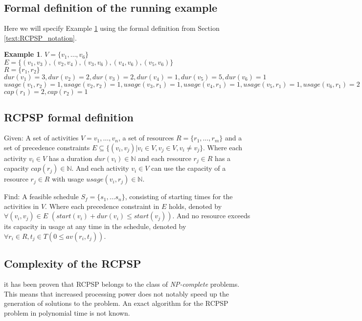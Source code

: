 \documentclass{article}
\theoremstyle{definition}
\newtheorem{example}{Example}[section]
\newcommand{\av}[2]{\ensuremath{av(r_{#1}, t_{#2})}} %
\newcommand{\capa}[1]{\ensuremath{cap(r_{#1})}} %
\newcommand{\dur}[1]{\ensuremath{dur(v_{#1})}} %
\newcommand{\usage}[2]{\ensuremath{usage(v_{#1}, r_{#2})}} %
\newcommand{\start}[1]{\ensuremath{start(v_{#1})}} %
\newenvironment{definition}[1][Definition]{\begin{trivlist}
\item[\hskip \labelsep {\bfseries #1}]}{\end{trivlist}}
\begin{document}
\subsection{Formal definition of the running example}
\label{text:running_example_definition}

Here we will specify Example \ref{exmp:running} using the formal definition from Section \ref{text:RCPSP_notation}.
\begin{example}
\label{exmp:running}
$V = \{v_1, \ldots, v_6\}$\\
$E = \{(v_1, v_3), (v_2, v_4), (v_3, v_6), (v_4, v_6), (v_5, v_6)\}$\\
$R = \{r_1, r_2\}$\\
$\dur{1} = 3, \dur{2} = 2, \dur{3} = 2, \dur{4} = 1, \dur{5} = 5, \dur{6} = 1$\\
$\usage{1}{2} = 1, \usage{2}{2} = 1, \usage{3}{1} = 1, \usage{4}{1} = 1, \usage{5}{1} = 1, \usage{6}{1} = 2$\\
$\capa{1} = 2, \capa{2} = 1$
\end{example}


\subsection{RCPSP formal definition}
\label{text:RCPSP_definition}

\begin{definition}
Given:
A set of activities $V = v_1, \ldots, v_n$, a set of resources $R = \{r_1, \ldots, r_m\}$ and a set of precedence constraints $E \subseteq  \{(v_i, v_j) | v_i \in V, v_j \in V, v_i \neq v_j\}$.
Where each activity $v_i \in V$ has a duration $\dur{i} \in \mathbb{N}$ and each resource $r_j \in R$ has a capacity $\capa{j} \in \mathbb{N}$. 
And each activity $v_i \in V$ can use the capacity of a resource $r_j \in R$ with usage $\usage{i}{j} \in \mathbb{N}$.

Find:
A feasible schedule $S_f = \{s_1, \ldots s_n\}$, consisting of starting times for the activities in $V$.
Where each precedence constraint in $E$ holds, denoted by $\forall (v_i, v_j) \in E$ $(\start{i} + \dur{i} \leq \start{j})$.
And no resource exceeds its capacity in usage at any time in the schedule, denoted by $\forall r_i \in R, t_j \in T (0 \leq \av{i}{j})$.
\end{definition}


\subsection{Complexity of the RCPSP}
\label{text:complex}
it has been proven that RCPSP belongs to the class of \emph{NP-complete} problems.
This means that increased processing power does not notably speed up the generation of solutions to the problem.
An exact algorithm for the RCPSP problem in polynomial time is not known.
\end{document}
